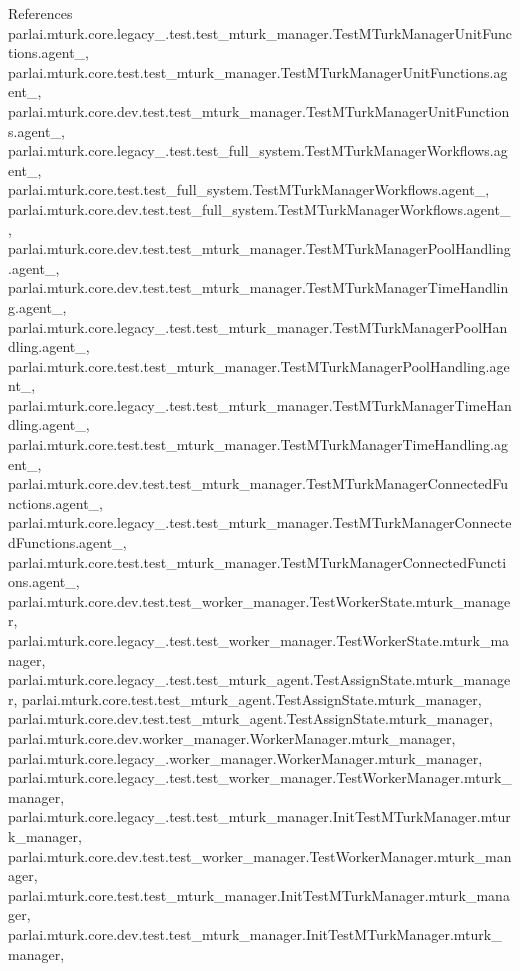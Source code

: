 References parlai.\+mturk.\+core.\+legacy\+\_.\+test.\+test\+\_\+mturk\+\_\+manager.\+Test\+M\+Turk\+Manager\+Unit\+Functions.\+agent\+\_, parlai.\+mturk.\+core.\+test.\+test\+\_\+mturk\+\_\+manager.\+Test\+M\+Turk\+Manager\+Unit\+Functions.\+agent\+\_, parlai.\+mturk.\+core.\+dev.\+test.\+test\+\_\+mturk\+\_\+manager.\+Test\+M\+Turk\+Manager\+Unit\+Functions.\+agent\+\_, parlai.\+mturk.\+core.\+legacy\+\_.\+test.\+test\+\_\+full\+\_\+system.\+Test\+M\+Turk\+Manager\+Workflows.\+agent\+\_, parlai.\+mturk.\+core.\+test.\+test\+\_\+full\+\_\+system.\+Test\+M\+Turk\+Manager\+Workflows.\+agent\+\_, parlai.\+mturk.\+core.\+dev.\+test.\+test\+\_\+full\+\_\+system.\+Test\+M\+Turk\+Manager\+Workflows.\+agent\+\_, parlai.\+mturk.\+core.\+dev.\+test.\+test\+\_\+mturk\+\_\+manager.\+Test\+M\+Turk\+Manager\+Pool\+Handling.\+agent\+\_, parlai.\+mturk.\+core.\+dev.\+test.\+test\+\_\+mturk\+\_\+manager.\+Test\+M\+Turk\+Manager\+Time\+Handling.\+agent\+\_, parlai.\+mturk.\+core.\+legacy\+\_.\+test.\+test\+\_\+mturk\+\_\+manager.\+Test\+M\+Turk\+Manager\+Pool\+Handling.\+agent\+\_, parlai.\+mturk.\+core.\+test.\+test\+\_\+mturk\+\_\+manager.\+Test\+M\+Turk\+Manager\+Pool\+Handling.\+agent\+\_, parlai.\+mturk.\+core.\+legacy\+\_.\+test.\+test\+\_\+mturk\+\_\+manager.\+Test\+M\+Turk\+Manager\+Time\+Handling.\+agent\+\_, parlai.\+mturk.\+core.\+test.\+test\+\_\+mturk\+\_\+manager.\+Test\+M\+Turk\+Manager\+Time\+Handling.\+agent\+\_, parlai.\+mturk.\+core.\+dev.\+test.\+test\+\_\+mturk\+\_\+manager.\+Test\+M\+Turk\+Manager\+Connected\+Functions.\+agent\+\_, parlai.\+mturk.\+core.\+legacy\+\_.\+test.\+test\+\_\+mturk\+\_\+manager.\+Test\+M\+Turk\+Manager\+Connected\+Functions.\+agent\+\_, parlai.\+mturk.\+core.\+test.\+test\+\_\+mturk\+\_\+manager.\+Test\+M\+Turk\+Manager\+Connected\+Functions.\+agent\+\_, parlai.\+mturk.\+core.\+dev.\+test.\+test\+\_\+worker\+\_\+manager.\+Test\+Worker\+State.\+mturk\+\_\+manager, parlai.\+mturk.\+core.\+legacy\+\_.\+test.\+test\+\_\+worker\+\_\+manager.\+Test\+Worker\+State.\+mturk\+\_\+manager, parlai.\+mturk.\+core.\+legacy\+\_.\+test.\+test\+\_\+mturk\+\_\+agent.\+Test\+Assign\+State.\+mturk\+\_\+manager, parlai.\+mturk.\+core.\+test.\+test\+\_\+mturk\+\_\+agent.\+Test\+Assign\+State.\+mturk\+\_\+manager, parlai.\+mturk.\+core.\+dev.\+test.\+test\+\_\+mturk\+\_\+agent.\+Test\+Assign\+State.\+mturk\+\_\+manager, parlai.\+mturk.\+core.\+dev.\+worker\+\_\+manager.\+Worker\+Manager.\+mturk\+\_\+manager, parlai.\+mturk.\+core.\+legacy\+\_.\+worker\+\_\+manager.\+Worker\+Manager.\+mturk\+\_\+manager, parlai.\+mturk.\+core.\+legacy\+\_.\+test.\+test\+\_\+worker\+\_\+manager.\+Test\+Worker\+Manager.\+mturk\+\_\+manager, parlai.\+mturk.\+core.\+legacy\+\_.\+test.\+test\+\_\+mturk\+\_\+manager.\+Init\+Test\+M\+Turk\+Manager.\+mturk\+\_\+manager, parlai.\+mturk.\+core.\+dev.\+test.\+test\+\_\+worker\+\_\+manager.\+Test\+Worker\+Manager.\+mturk\+\_\+manager, parlai.\+mturk.\+core.\+test.\+test\+\_\+mturk\+\_\+manager.\+Init\+Test\+M\+Turk\+Manager.\+mturk\+\_\+manager, parlai.\+mturk.\+core.\+dev.\+test.\+test\+\_\+mturk\+\_\+manager.\+Init\+Test\+M\+Turk\+Manager.\+mturk\+\_\+manager, 